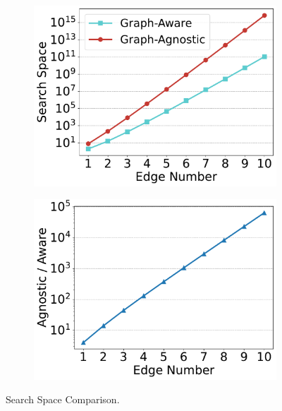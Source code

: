 \begin{figure}[ht]
    \centering
    \begin{subfigure}[b]{.48\linewidth}
        \centering
        \includegraphics[width=\linewidth]{./figures/exp/compare_search_space.pdf}
    \end{subfigure}
    \begin{subfigure}[b]{0.48\linewidth}
        \centering
        \includegraphics[width=\linewidth]{./figures/exp/compare_search_space_ratio.pdf}
    \end{subfigure}
    \caption{Search Space Comparison.}
    \label{fig:exp-search-space}
\end{figure}


